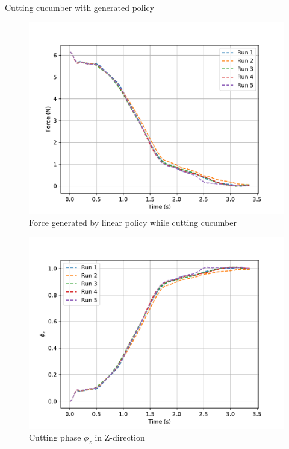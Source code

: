 \documentclass[aspectratio=169]{beamer}
\begin{document}
\begin{frame}
	Cutting cucumber with generated policy
	
	\begin{minipage}[t]{0.49\textwidth}
		\begin{figure}
			\includegraphics[width=\textwidth]{images/exp/cut/power_f1}
			\caption{\scriptsize Force generated by linear policy while cutting cucumber}
		\end{figure}
	\end{minipage}
	\hfill
	\begin{minipage}[t]{0.49\textwidth}
		
		\begin{figure}
			\includegraphics[width=\textwidth]{images/exp/cut/power_ph_z1}
			\caption{\scriptsize Cutting phase $\phi_{z}$ in Z-direction}
		\end{figure}
	\end{minipage}
\end{frame}
\end{document}
